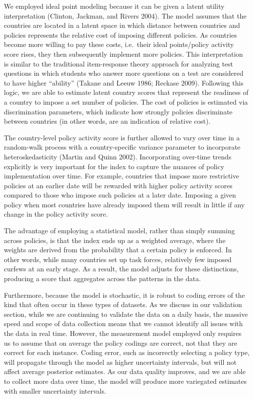 \documentclass[]{article}
\begin{document}
We employed ideal point modeling because it can be given a latent utility interpretation (Clinton, Jackman, and Rivers 2004). The model assumes that the countries are located in a latent space in which distance between countries and policies represents the relative cost of imposing different policies. As countries become more willing to pay these costs, i.e.~their ideal points/policy activity score rises, they then subsequently implement more policies. This interpretation is similar to the traditional item-response theory approach for analyzing test questions in which students who answer more questions on a test are considered to have higher ``ability'' (Takane and Leeuw 1986; Reckase 2009). Following this logic, we are able to estimate latent country scores that represent the readiness of a country to impose a set number of policies. The cost of policies is estimated via discrimination parameters, which indicate how strongly policies discriminate between countries (in other words, are an indication of relative cost).

The country-level policy activity score is further allowed to vary over time in a random-walk process with a country-specific variance parameter to incorporate heteroskedasticity (Martin and Quinn 2002). Incorporating over-time trends explicitly is very important for the index to capture the nuances of policy implementation over time. For example, countries that impose more restrictive policies at an earlier date will be rewarded with higher policy activity scores compared to those who impose such policies at a later date. Imposing a given policy when most countries have already imposed them will result in little if any change in the policy activity score.

The advantage of employing a statistical model, rather than simply summing across policies, is that the index ends up as a weighted average, where the weights are derived from the probability that a certain policy is enforced. In other words, while many countries set up task forces, relatively few imposed curfews at an early stage. As a result, the model adjusts for these distinctions, producing a score that aggregates across the patterns in the data.

Furthermore, because the model is stochastic, it is robust to coding errors of the kind that often occur in these types of datasets. As we discuss in our validation section, while we are continuing to validate the data on a daily basis, the massive speed and scope of data collection means that we cannot identify all issues with the data in real time. However, the measurement model employed only requires us to assume that on average the policy codings are correct, not that they are correct for each instance. Coding error, such as incorrectly selecting a policy type, will propagate through the model as higher uncertainty intervals, but will not affect average posterior estimates. As our data quality improves, and we are able to collect more data over time, the model will produce more variegated estimates with smaller uncertainty intervals.
\end{document}
